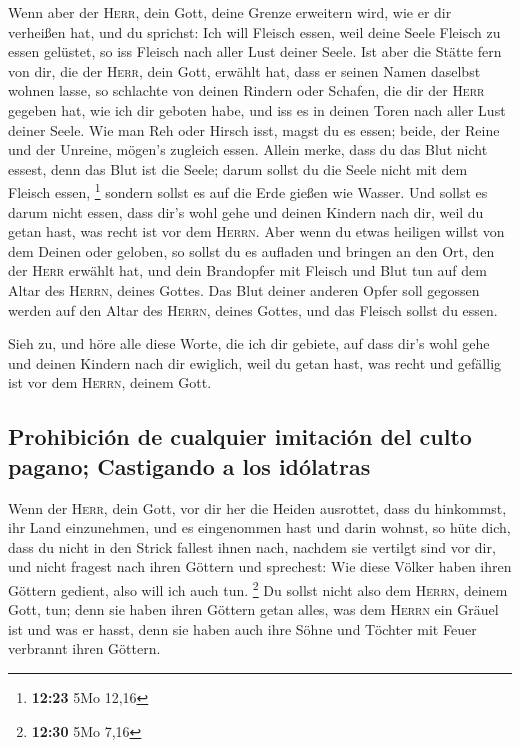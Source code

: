  Wenn aber der \textsc{Herr}, dein Gott, deine Grenze
erweitern wird, wie er dir verheißen hat, und du sprichst: Ich will
Fleisch essen, weil deine Seele Fleisch zu essen gelüstet, so iss
Fleisch nach aller Lust deiner Seele.  Ist aber die
Stätte fern von dir, die der \textsc{Herr}, dein Gott, erwählt hat, dass
er seinen Namen daselbst wohnen lasse, so schlachte von deinen Rindern
oder Schafen, die dir der \textsc{Herr} gegeben hat, wie ich dir geboten
habe, und iss es in deinen Toren nach aller Lust deiner Seele.
 Wie man Reh oder Hirsch isst, magst du es essen; beide,
der Reine und der Unreine, mögen's zugleich essen. 
Allein merke, dass du das Blut nicht essest, denn das Blut ist die
Seele; darum sollst du die Seele nicht mit dem Fleisch essen,
\footnote{\textbf{12:23} 5Mo 12,16}  sondern sollst es
auf die Erde gießen wie Wasser.  Und sollst es darum
nicht essen, dass dir's wohl gehe und deinen Kindern nach dir, weil du
getan hast, was recht ist vor dem \textsc{Herrn}.  Aber
wenn du etwas heiligen willst von dem Deinen oder geloben, so sollst du
es aufladen und bringen an den Ort, den der \textsc{Herr} erwählt hat,
 und dein Brandopfer mit Fleisch und Blut tun auf dem
Altar des \textsc{Herrn}, deines Gottes. Das Blut deiner anderen Opfer
soll gegossen werden auf den Altar des \textsc{Herrn}, deines Gottes,
und das Fleisch sollst du essen.

 Sieh zu, und höre alle diese Worte, die ich dir gebiete,
auf dass dir's wohl gehe und deinen Kindern nach dir ewiglich, weil du
getan hast, was recht und gefällig ist vor dem \textsc{Herrn}, deinem
Gott.

\hypertarget{prohibiciuxf3n-de-cualquier-imitaciuxf3n-del-culto-pagano-castigando-a-los-iduxf3latras}{%
\subsection{Prohibición de cualquier imitación del culto pagano;
Castigando a los
idólatras}\label{prohibiciuxf3n-de-cualquier-imitaciuxf3n-del-culto-pagano-castigando-a-los-iduxf3latras}}

 Wenn der \textsc{Herr}, dein Gott, vor dir her die
Heiden ausrottet, dass du hinkommst, ihr Land einzunehmen, und es
eingenommen hast und darin wohnst,  so hüte dich, dass du
nicht in den Strick fallest ihnen nach, nachdem sie vertilgt sind vor
dir, und nicht fragest nach ihren Göttern und sprechest: Wie diese
Völker haben ihren Göttern gedient, also will ich auch tun. \footnote{\textbf{12:30}
  5Mo 7,16}  Du sollst nicht also dem \textsc{Herrn},
deinem Gott, tun; denn sie haben ihren Göttern getan alles, was dem
\textsc{Herrn} ein Gräuel ist und was er hasst, denn sie haben auch ihre
Söhne und Töchter mit Feuer verbrannt ihren Göttern.

